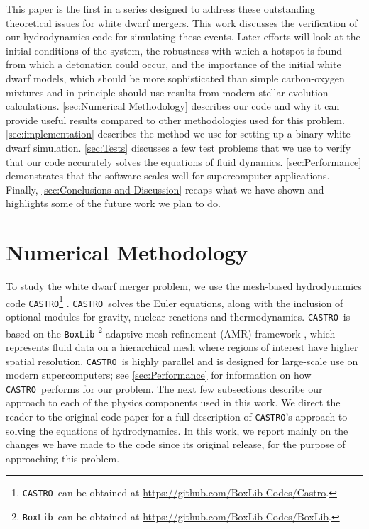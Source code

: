 \documentclass[iop,numberedappendix]{../emulateapj}
\newcommand{\boxlib}{\texttt{BoxLib}}
\newcommand{\castro}{\texttt{CASTRO}}
\begin{document}
This paper is the first in a series designed to address these
outstanding theoretical issues for white dwarf mergers. This work 
discusses the verification of our hydrodynamics code for simulating
these events. Later efforts will look at the initial conditions of the
system, the robustness with which a hotspot is found from which a
detonation could occur, and the importance of the initial white dwarf
models, which should be more sophisticated than simple carbon-oxygen
mixtures and in principle should use results from modern stellar
evolution calculations. \autoref{sec:Numerical Methodology}
describes our code and why it can provide useful results compared to
other methodologies used for this problem. 
\autoref{sec:implementation} describes the method we use for setting up a
binary white dwarf simulation. \autoref{sec:Tests} discusses a few
test problems that we use to verify that our code accurately
solves the equations of fluid dynamics. \autoref{sec:Performance}
demonstrates that the software scales well for supercomputer
applications. Finally, \autoref{sec:Conclusions and Discussion}
recaps what we have shown and highlights some of the future work we
plan to do.

\section{Numerical Methodology}\label{sec:Numerical Methodology}

To study the white dwarf merger problem, we use the mesh-based
hydrodynamics code \castro\footnote{\castro\ can be obtained at \url{https://github.com/BoxLib-Codes/Castro}.} \citep{castro}.
\castro\ solves the Euler
equations, along with the inclusion of optional modules for gravity,
nuclear reactions and thermodynamics. \castro\ is based on the \boxlib
\footnote{\boxlib\ can be obtained at \url{https://github.com/BoxLib-Codes/BoxLib}.}
adaptive-mesh refinement (AMR) framework \citep{rendleman:2000}, which
represents fluid data on a hierarchical mesh where regions of interest have higher
spatial resolution. \castro\ is highly parallel and is designed for
large-scale use on modern supercomputers; see 
\autoref{sec:Performance} for information on how \castro\ performs for our
problem. The next few subsections describe our approach to each of the
physics components used in this work. We direct the reader to the
original code paper for a full description of \castro's approach to
solving the equations of hydrodynamics. In this work, we report mainly
on the changes we have made to the code since its original release,
for the purpose of approaching this problem.
\end{document}
